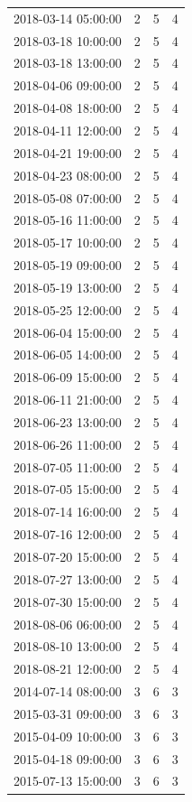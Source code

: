 \begin{tabular}{lrrr}
2018-03-14 05:00:00 & 2 & 5 & 4 \\
2018-03-18 10:00:00 & 2 & 5 & 4 \\
2018-03-18 13:00:00 & 2 & 5 & 4 \\
2018-04-06 09:00:00 & 2 & 5 & 4 \\
2018-04-08 18:00:00 & 2 & 5 & 4 \\
2018-04-11 12:00:00 & 2 & 5 & 4 \\
2018-04-21 19:00:00 & 2 & 5 & 4 \\
2018-04-23 08:00:00 & 2 & 5 & 4 \\
2018-05-08 07:00:00 & 2 & 5 & 4 \\
2018-05-16 11:00:00 & 2 & 5 & 4 \\
2018-05-17 10:00:00 & 2 & 5 & 4 \\
2018-05-19 09:00:00 & 2 & 5 & 4 \\
2018-05-19 13:00:00 & 2 & 5 & 4 \\
2018-05-25 12:00:00 & 2 & 5 & 4 \\
2018-06-04 15:00:00 & 2 & 5 & 4 \\
2018-06-05 14:00:00 & 2 & 5 & 4 \\
2018-06-09 15:00:00 & 2 & 5 & 4 \\
2018-06-11 21:00:00 & 2 & 5 & 4 \\
2018-06-23 13:00:00 & 2 & 5 & 4 \\
2018-06-26 11:00:00 & 2 & 5 & 4 \\
2018-07-05 11:00:00 & 2 & 5 & 4 \\
2018-07-05 15:00:00 & 2 & 5 & 4 \\
2018-07-14 16:00:00 & 2 & 5 & 4 \\
2018-07-16 12:00:00 & 2 & 5 & 4 \\
2018-07-20 15:00:00 & 2 & 5 & 4 \\
2018-07-27 13:00:00 & 2 & 5 & 4 \\
2018-07-30 15:00:00 & 2 & 5 & 4 \\
2018-08-06 06:00:00 & 2 & 5 & 4 \\
2018-08-10 13:00:00 & 2 & 5 & 4 \\
2018-08-21 12:00:00 & 2 & 5 & 4 \\
2014-07-14 08:00:00 & 3 & 6 & 3 \\
2015-03-31 09:00:00 & 3 & 6 & 3 \\
2015-04-09 10:00:00 & 3 & 6 & 3 \\
2015-04-18 09:00:00 & 3 & 6 & 3 \\
2015-07-13 15:00:00 & 3 & 6 & 3 \\

\end{tabular}
